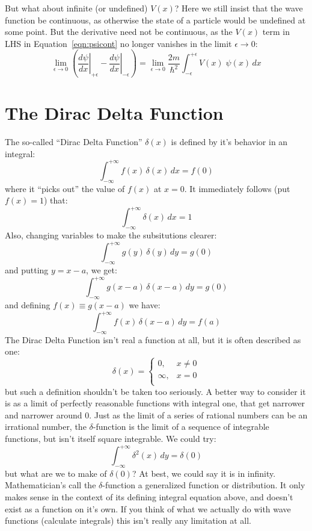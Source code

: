 \documentclass[12pt]{book}
\begin{document}
But what about infinite (or undefined) $V(x)$?  Here we still insist that the wave function be continuous, as otherwise the state of a particle would be undefined at some point.  But the derivative need not be continuous, as the $V(x)$ term in LHS in Equation~\ref{eqn:psicont} no longer vanishes in the limit $\epsilon \to 0$:
\begin{equation}
\label{eqn:psidiscont}
\lim_{\epsilon \to 0} \left( \left. \frac{d\psi}{d x} \right\rvert_{+\epsilon} 
- \left. \frac{d\psi}{d x} \right\rvert_{-\epsilon} \right) = 
\lim_{\epsilon \to 0}
\frac{2m}{\hbar^2}\int_{-\epsilon}^{+\epsilon} V(x) \; \psi(x) \, dx
\end{equation}

\section{The Dirac Delta Function}

The so-called ``Dirac Delta Function'' $\delta(x)$ is defined by it's behavior in an integral:
\begin{equation}
\int_{-\infty}^{+\infty} f(x) \, \delta(x) \, dx = f(0) 
\end{equation}
where it ``picks out'' the value of $f(x)$ at $x=0$.  It immediately follows (put $f(x)=1$) that:
\begin{equation}
\int_{-\infty}^{+\infty} \delta(x) \, dx = 1 
\end{equation}
Also, changing variables to make the subsitutions clearer:
$$\int_{-\infty}^{+\infty} g(y) \, \delta(y) \, dy = g(0)$$
and putting $y = x - a$, we get:
$$\int_{-\infty}^{+\infty} g(x-a) \, \delta(x-a) \, dy = g(0)$$
and defining $f(x) \equiv g(x-a)$ we have:
\begin{equation}
\int_{-\infty}^{+\infty} f(x) \, \delta(x-a) \, dy = f(a)
\end{equation}
The Dirac Delta Function isn't real a function at all, but it is often described as one:
$$\delta(x) = \begin{cases}
0, & x \neq 0 \\
\infty, & x=0 \\
\end{cases}
$$
but such a definition shouldn't be taken too seriously.  A better way to consider it is as a limit of perfectly reasonable functions with integral one, that get narrower and narrower around 0.  Just as the limit of a series of rational numbers can be an irrational number, the $\delta$-function is the limit of a sequence of integrable functions, but isn't itself square integrable.  We could try:
\begin{equation}
\int_{-\infty}^{+\infty} \delta^2(x) \, dy = \delta(0) 
\end{equation}
but what are we to make of $\delta(0)$? At best, we could say it is in infinity.  Mathematician's call the $\delta$-function a generalized function or distribution.  It only makes sense in the context of its defining integral equation above, and doesn't exist as a function on it's own.  If you think of what we actually do with wave functions (calculate integrals) this isn't really any limitation at all.
\end{document}
